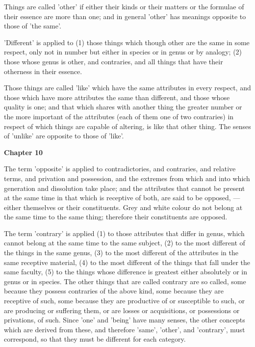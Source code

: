 Things are called 'other' if either their kinds or their matters or the formulae of their essence are more than one; and in general 'other' has meanings opposite to those of 'the same'.

'Different' is applied to (1) those things which though other are the same in some respect, only not in number but either in species or in genus or by analogy; (2) those whose genus is other, and contraries, and all things that have their otherness in their essence.

Those things are called 'like' which have the same attributes in every respect, and those which have more attributes the same than different, and those whose quality is one; and that which shares with another thing the greater number or the more important of the attributes (each of them one of two contraries) in respect of which things are capable of altering, is like that other thing. The senses of 'unlike' are opposite to those of 'like'.

\textbf{Chapter 10}

The term 'opposite' is applied to contradictories, and contraries, and relative terms, and privation and possession, and the extremes from which and into which generation and dissolution take place; and the attributes that cannot be present at the same time in that which is receptive of both, are said to be opposed, — either themselves or their constituents. Grey and white colour do not belong at the same time to the same thing; therefore their constituents are opposed.

The term 'contrary' is applied (1) to those attributes that differ in genus, which cannot belong at the same time to the same subject, (2) to the most different of the things in the same genus, (3) to the most different of the attributes in the same receptive material, (4) to the most different of the things that fall under the same faculty, (5) to the things whose difference is greatest either absolutely or in genus or in species. The other things that are called contrary are so called, some because they possess contraries of the above kind, some because
they are receptive of such, some because they are productive of or susceptible to such, or are producing or suffering them, or are losses or acquisitions, or possessions or privations, of such. Since 'one' and 'being' have many senses, the other concepts which are derived from these, and therefore 'same', 'other', and 'contrary', must correspond, so that they must be different for each category.


